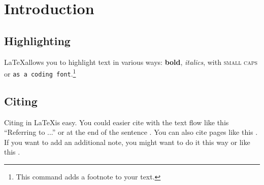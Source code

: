\setcounter{page}{1} %

\section{Introduction} %
\subsection{Highlighting} %
\LaTeX allows you to highlight text in various ways: \textbf{bold}, \textit{italics},
with \textsc{small caps} or \texttt{as a coding font}.\footnote{ This command adds
a footnote to your text.}

\subsection{Citing}
Citing in \LaTeX is easy. You could easier cite with the text flow like this ``Referring
to \cite{collier2004greed} ...'' or at the end of the sentence \cite{collier2004greed}.
You can also cite pages like this \citep[55]{collier2004greed}. If you want to add
an additional note, you might want to do it this way \citep[cp.][22]{collier2004greed}
or like this \citep[cp.][]{collier2004greed}.\\ \blindtext %